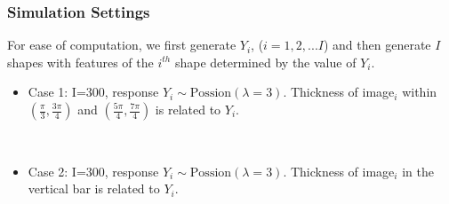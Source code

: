 \documentclass[9 pt]{beamer}
\newcommand{\bi}{\begin{itemize}}
\newcommand{\ei}{\end{itemize}}
\begin{document}
\begin{frame}
\frametitle{Simulation Settings}
For ease of computation, we first generate $Y_i$, ($i=1,2,...I$) and then generate $I$ shapes with features of the $i^{th}$ shape determined by the value of $Y_i$.

\bi
\item<3-| alert@3>Case 1: I=300, response $Y_i\sim \text{Possion}(\lambda=3)$. Thickness of image$_i$ within $(\frac{\pi}{3},\frac{3\pi}{4})$ and $(\frac{5\pi}{4},\frac{7\pi}{4})$ is related to $Y_i$.
\begin{figure}[!th]
\centering
{}
\end{figure}\

\item<4-| alert@4> Case 2: I=300, response $Y_i\sim \text{Possion}(\lambda=3)$. Thickness of image$_i$ in the vertical bar is related to $Y_i$.
\begin{figure}[!th]
\centering
{}
\end{figure}
\ei
\end{frame}
\end{document}
